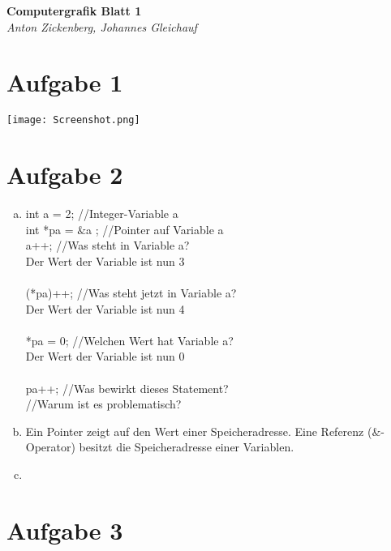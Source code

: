 \documentclass[12pt]{article}
\begin{document}
\begin{center}
 \textbf{\Large Computergrafik Blatt 1}\\
 \emph{Anton Zickenberg, Johannes Gleichauf}
\end{center}

\section*{Aufgabe 1}
\texttt{[image: Screenshot.png]}
\section*{Aufgabe 2}
\begin{enumerate}[a)]
\item int a = 2; //Integer-Variable a\\ 
	  int *pa = $\&$a ; //Pointer auf Variable a\\ 
	  a++; //Was steht in Variable a?\\ 
	  Der Wert der Variable ist nun 3\\
	  \\	  
	  (*pa)++; //Was steht jetzt in Variable a?\\ 
	  Der Wert der Variable ist nun 4\\
	  \\
	  *pa = 0; //Welchen Wert hat Variable a?\\
	  Der Wert der Variable ist nun 0\\
	  \\ 
	  pa++; //Was bewirkt dieses Statement?\\ 
	  		//Warum ist es problematisch?\\
\item Ein Pointer zeigt auf den Wert einer Speicheradresse. Eine Referenz ($\&$-Operator) besitzt die Speicheradresse einer Variablen.
\item 
\end{enumerate}
\section*{Aufgabe 3}
\end{document}
